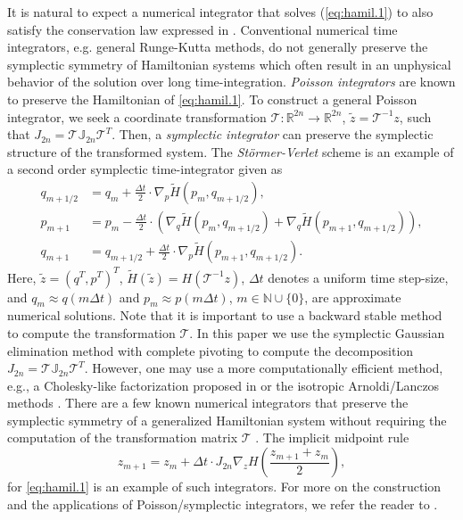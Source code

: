 It is natural to expect a numerical integrator that solves (\ref{eq:hamil.1}) to also satisfy the conservation law expressed in  . Conventional numerical time integrators, e.g. general Runge-Kutta methods, do not generally preserve the symplectic symmetry of Hamiltonian systems which often result in an unphysical behavior of the solution over long time-integration. \emph{Poisson integrators} \cite{Hairer:1250576} are known to preserve the Hamiltonian of \eqref{eq:hamil.1}. To construct a general Poisson integrator, we seek a coordinate transformation $\mathcal T:\mathbb R^{2n}\to\mathbb R^{2n}$, $\tilde z = \mathcal T^{-1}z$, such that $J_{2n} = \mathcal T \mathbb J_{2n} \mathcal T^T$. Then, a \emph{symplectic integrator} can preserve the symplectic structure of the transformed system. The \emph{St\"ormer-Verlet} scheme is an example of a second order symplectic time-integrator given as
\begin{equation} \label{eq:hamil.6}
	\begin{aligned}
	q_{m+1/2} &= q_m + \frac{\Delta t} 2 \cdot \nabla_p \tilde H(p_m,q_{m+1/2}), \\
	p_{m+1} &= p_m - \frac{\Delta t} 2  \cdot \left( \nabla_q \tilde H(p_m,q_{m+1/2}) + \nabla_{q} \tilde H(p_{m+1},q_{m+1/2}) \right), \\
	q_{m+1} &= q_{m+1/2} + \frac{\Delta t} 2  \cdot  \nabla_p \tilde H(p_{m+1},q_{m+1/2}).
	\end{aligned}
\end{equation}
Here, $\tilde z = (q^T,p^T)^T$, $\tilde H(\tilde z) = H(\mathcal T^{-1}z)$, $\Delta t$ denotes a uniform time step-size, and $q_m \approx q(m\Delta t)$ and $p_m \approx p(m\Delta t)$, $m \in \mathbb{N} \cup \{ 0\}$, are approximate numerical solutions. Note that it is important to use a backward stable method to compute the transformation $\mathcal T$. In this paper we use the symplectic Gaussian elimination method with complete pivoting to compute the decomposition $J_{2n} = \mathcal T \mathbb J_{2n} \mathcal T^T$. However, one may use a more computationally efficient method, e.g., a Cholesky-like factorization proposed in \cite{benner:chol} or the isotropic Arnoldi/Lanczos methods \cite{doi:10.1137/S1064827500366434}. There are a few known numerical integrators that preserve the symplectic symmetry of a generalized Hamiltonian system without requiring the computation of the transformation matrix $\mathcal T$ \cite{Hairer:1250576}. The implicit midpoint rule
\begin{equation} \label{eq:hamil.7}
	z_{m+1} = z_{m} + \Delta t \cdot J_{2n} \nabla_z H \left( \frac{z_{m+1} + z_m}{2} \right),
\end{equation}
for \cref{eq:hamil.1} is an example of such integrators. For more on the construction and the applications of Poisson/symplectic integrators, we refer the reader to \cite{Hairer:1250576,bhatt2017structure}.
